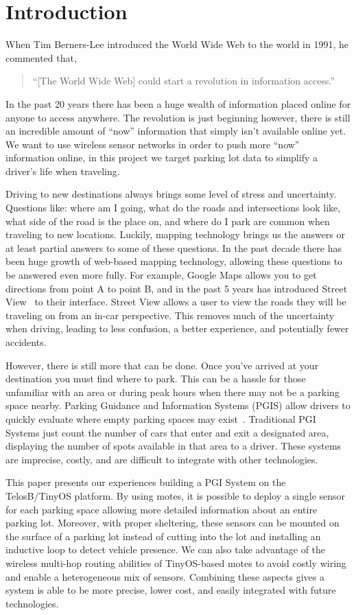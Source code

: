 \documentclass{acm_proc}
\begin{document}
\section{Introduction}
When Tim Berners-Lee introduced the World Wide Web to the world in 1991, he
commented that,
\begin{quote}
``[The World Wide Web] could start a revolution in information
access.''
\end{quote}
In the past 20 years there has been a huge wealth of information placed
online for anyone to access anywhere.
The revolution is just beginning however, there is still an incredible
amount of ``now'' information that simply isn't available online yet.
We want to use wireless sensor networks in order to push more ``now''
information online, in this project we target parking lot data to simplify
a driver's life when traveling.

Driving to new destinations always brings some level of stress and
uncertainty.
Questions like: where am I going, what do the roads and intersections look
like, what side of the road is the place on, and where do I park are common
when traveling to new locations.
Luckily, mapping technology brings us the answers or at least partial
answers to some of these questions.
In the past decade there has been huge growth of web-based mapping
technology, allowing these questions to be answered even more fully.
For example, Google Maps allows you to get directions from point A to point
B, and in the past 5 years has introduced Street
View~\cite{vincent:streetview} to their interface.
Street View allows a user to view the roads they will be traveling on from
an in-car perspective.
This removes much of the uncertainty when driving, leading to less
confusion, a better experience, and potentially fewer accidents.

However, there is still more that can be done.
Once you've arrived at your destination you must find where to park.
This can be a hassle for those unfamiliar with an area or
during peak hours when there may not be a parking space nearby.
Parking Guidance and Information Systems (PGIS) allow drivers to quickly
evaluate where empty parking spaces may exist~\cite{sakai:pgi-toyota}.
Traditional PGI Systems just count the number of cars that enter and exit a
designated area, displaying the number of spots available in that area to a
driver.
These systems are imprecise, costly, and are difficult to integrate with
other technologies.

This paper presents our experiences building a PGI System on the
TelosB/TinyOS platform.
By using motes, it is possible to deploy a single sensor for each parking
space allowing more detailed information about an entire parking lot.
Moreover, with proper sheltering, these sensors can be mounted on the
surface of a parking lot instead of cutting into the lot and installing an
inductive loop to detect vehicle presence.
We can also take advantage of the wireless multi-hop routing abilities of
TinyOS-based motes to avoid costly wiring and enable a heterogeneous mix of
sensors.
Combining these aspects gives a system is able to be more precise, lower
cost, and easily integrated with future technologies.
\end{document}
